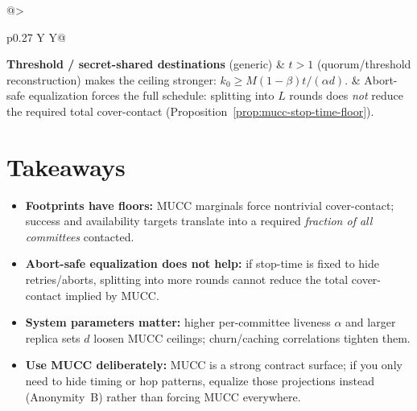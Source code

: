 \documentclass[11pt]{article}
\begin{document}
\begin{table}[t]
\begin{tabularx}{\linewidth}{@{}>{\raggedright\arraybackslash}p{0.27\linewidth} Y Y@{}}
\textbf{Threshold / secret-shared destinations} (generic)
& $t>1$ (quorum/threshold reconstruction) makes the ceiling stronger: $k_0\ge M(1-\beta)t/(\alpha d)$.
& Abort-safe equalization forces the full schedule: splitting into $L$ rounds does \emph{not} reduce the required total cover-contact (Proposition~\ref{prop:mucc-stop-time-floor}). \\
\bottomrule
\end{tabularx}
\caption{One-page mapping from common anonymous DHT/directory design patterns into the parameters of Theorem~\ref{thm:mucc-ceiling}.
The mapping is intentionally conservative and ignores correlations that would only worsen the ceiling.
}
\label{tab:protocol-mapping}
\end{table}





\section{Takeaways}
\begin{itemize}[leftmargin=*]
\item \textbf{Footprints have floors:} MUCC marginals force nontrivial cover-contact; success and availability targets translate into a required \emph{fraction of all committees} contacted.
\item \textbf{Abort-safe equalization does not help:} if stop-time is fixed to hide retries/aborts, splitting into more rounds cannot reduce the total cover-contact implied by MUCC.
\item \textbf{System parameters matter:} higher per-committee liveness $\alpha$ and larger replica sets $d$ loosen MUCC ceilings; churn/caching correlations tighten them.
\item \textbf{Use MUCC deliberately:} MUCC is a strong contract surface; if you only need to hide timing or hop patterns, equalize those projections instead (Anonymity~B) rather than forcing MUCC everywhere.
\end{itemize}
\end{document}

